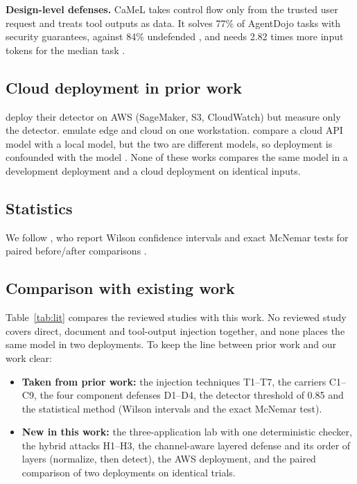 \documentclass[a4paper,fleqn]{cas-dc}
\begin{document}
\textbf{Design-level defenses.}
CaMeL \citep{P08} takes control flow only from the trusted user request and treats tool outputs as data.
It solves 77\% of AgentDojo tasks with security guarantees, against 84\% undefended \citep[p.~1]{P08}, and needs 2.82 times more input tokens for the median task \citep[p.~11]{P08}.

\subsection{Cloud deployment in prior work}
\citet{P06} deploy their detector on AWS (SageMaker, S3, CloudWatch) but measure only the detector.
\citet{P09} emulate edge and cloud on one workstation.
\citet{P10} compare a cloud API model with a local model, but the two are different models, so deployment is confounded with the model \citep[p.~4]{P10}.
None of these works compares the same model in a development deployment and a cloud deployment on identical inputs.

\subsection{Statistics}
We follow \citet{P10}, who report Wilson confidence intervals and exact McNemar tests for paired before/after comparisons \citep[p.~4]{P10}.

\subsection{Comparison with existing work}
Table~\ref{tab:lit} compares the reviewed studies with this work.
No reviewed study covers direct, document and tool-output injection together, and none places the same model in two deployments.
To keep the line between prior work and our work clear:
\begin{itemize}
\item \textbf{Taken from prior work:} the injection techniques T1--T7, the carriers C1--C9, the four component defenses D1--D4, the detector threshold of 0.85 and the statistical method (Wilson intervals and the exact McNemar test).
\item \textbf{New in this work:} the three-application lab with one deterministic checker, the hybrid attacks H1--H3, the channel-aware layered defense and its order of layers (normalize, then detect), the AWS deployment, and the paired comparison of two deployments on identical trials.
\end{itemize}
\end{document}
